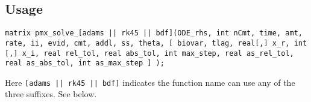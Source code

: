 \documentclass[12pt, reqno, oneside]{amsbook}
\numberwithin{equation}{chapter}
\numberwithin{figure}{chapter}
\numberwithin{table}{chapter}
\theoremstyle{remark}
\begin{document}
\subsection{Usage}
\label{sec:orgdaea332}
\begin{verbatim}
matrix pmx_solve_[adams || rk45 || bdf](ODE_rhs, int nCmt, time, amt, rate, ii, evid, cmt, addl, ss, theta, [ biovar, tlag, real[,] x_r, int [,] x_i, real rel_tol, real abs_tol, int max_step, real as_rel_tol, real as_abs_tol, int as_max_step ] );
\end{verbatim}
Here \texttt{[adams || rk45 || bdf]} indicates the
function name can use any of the three suffixes. See below.
\end{document}
